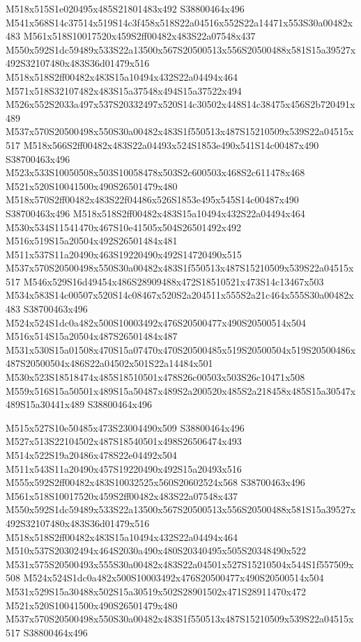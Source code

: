 \documentclass{article}
\begin{document}
\begin{multicols}{2}
M518x515S1e020495x485S21801483x492 S38800464x496 M541x568S14c37514x519S14c3f458x518S22a04516x552S22a14471x553S30a00482x483 M561x518S10017520x459S2ff00482x483S22a07548x437 M550x592S1dc59489x533S22a13500x567S20500513x556S20500488x581S15a39527x492S32107480x483S36d01479x516 M518x518S2ff00482x483S15a10494x432S22a04494x464 M571x518S32107482x483S15a37548x494S15a37522x494 M526x552S2033a497x537S20332497x520S14c30502x448S14c38475x456S2b720491x489 M537x570S20500498x550S30a00482x483S1f550513x487S15210509x539S22a04515x517 M518x566S2ff00482x483S22a04493x524S1853e490x541S14c00487x490 S38700463x496 M523x533S10050508x503S10058478x503S2c600503x468S2c611478x468 M521x520S10041500x490S26501479x480 M518x570S2ff00482x483S22f04486x526S1853e495x545S14c00487x490 S38700463x496 M518x518S2ff00482x483S15a10494x432S22a04494x464 M530x534S11541470x467S10e41505x504S26501492x492 M516x519S15a20504x492S26501484x481 M511x537S11a20490x463S19220490x492S14720490x515 M537x570S20500498x550S30a00482x483S1f550513x487S15210509x539S22a04515x517 M546x529S16d49454x486S28909488x472S18510521x473S14c13467x503 M534x583S14c00507x520S14c08467x520S2a204511x555S2a21c464x555S30a00482x483 S38700463x496 M524x524S1dc0a482x500S10003492x476S20500477x490S20500514x504 M516x514S15a20504x487S26501484x487 M531x530S15a01508x470S15a07470x470S20500485x519S20500504x519S20500486x487S20500504x486S22a04502x501S22a14484x501 M530x523S18518474x485S18510501x478S26c00503x503S26c10471x508 M559x516S15a50501x489S15a50487x489S2a200520x485S2a218458x485S15a30547x489S15a30441x489 S38800464x496

M515x527S10e50485x473S23004490x509 S38800464x496 M527x513S22104502x487S18540501x498S26506474x493 M514x522S19a20486x478S22e04492x504 M511x543S11a20490x457S19220490x492S15a20493x516 M555x592S2ff00482x483S10032525x560S20602524x568 S38700463x496 M561x518S10017520x459S2ff00482x483S22a07548x437 M550x592S1dc59489x533S22a13500x567S20500513x556S20500488x581S15a39527x492S32107480x483S36d01479x516 M518x518S2ff00482x483S15a10494x432S22a04494x464 M510x537S20302494x464S2030a490x480S20340495x505S20348490x522 M531x575S20500493x555S30a00482x483S22a04501x527S15210504x544S1f557509x508 M524x524S1dc0a482x500S10003492x476S20500477x490S20500514x504 M531x529S15a30488x502S15a30519x502S28901502x471S28911470x472 M521x520S10041500x490S26501479x480 M537x570S20500498x550S30a00482x483S1f550513x487S15210509x539S22a04515x517 S38800464x496


\end{multicols}
\end{document}
